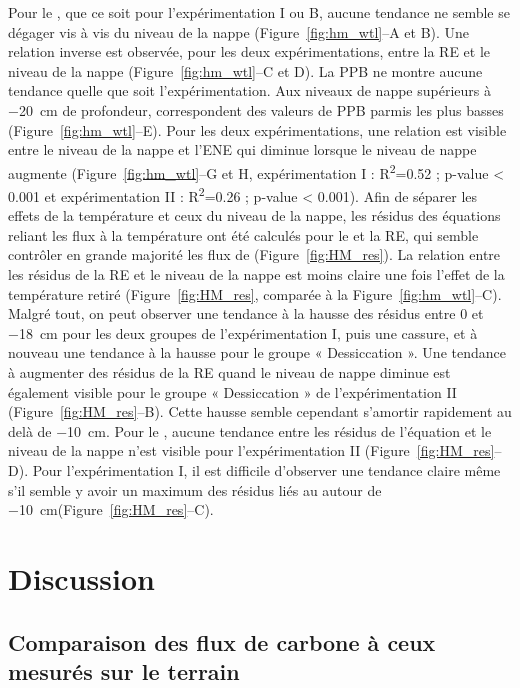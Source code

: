 Pour le \chh, que ce soit pour l'expérimentation I ou B, aucune tendance ne semble se dégager vis à vis du niveau de la nappe (Figure~\ref{fig:hm_wtl}--A et B).
Une relation inverse est observée, pour les deux expérimentations, entre la RE et le niveau de la nappe (Figure~\ref{fig:hm_wtl}--C et D).
La PPB ne montre aucune tendance quelle que soit l'expérimentation.
Aux niveaux de nappe supérieurs à \SI{-20}{\centi\metre} de profondeur, correspondent des valeurs de PPB parmis les plus basses (Figure~\ref{fig:hm_wtl}--E).
Pour les deux expérimentations, une relation est visible entre le niveau de la nappe et l'ENE qui diminue lorsque le niveau de nappe augmente (Figure~\ref{fig:hm_wtl}--G et H, expérimentation I : R\textsuperscript{2}=\num{0.52} ; p-value < \num{0.001} et  expérimentation II : R\textsuperscript{2}=\num{0.26} ; p-value < \num{0.001}).
Afin de séparer les effets de la température et ceux du niveau de la nappe, les résidus des équations reliant les flux à la température ont été calculés pour le \chh et la RE, qui semble contrôler en grande majorité les flux de \coo (Figure~\ref{fig:HM_res}).
La relation entre les résidus de la RE et le niveau de la nappe est moins claire une fois l'effet de la température retiré (Figure~\ref{fig:HM_res}, comparée à la Figure~\ref{fig:hm_wtl}--C).
Malgré tout, on peut observer une tendance à la hausse des résidus entre 0 et \SI{-18}{\centi\metre} pour les deux groupes de l'expérimentation I, puis une cassure, et à nouveau une tendance à la hausse pour le groupe « Dessiccation ».
Une tendance à augmenter des résidus de la RE quand le niveau de nappe diminue est également visible pour le groupe « Dessiccation » de l'expérimentation II (Figure~\ref{fig:HM_res}--B).
Cette hausse semble cependant s'amortir rapidement au delà de \SI{-10}{\centi\metre}.
Pour le \chh, aucune tendance entre les résidus de l'équation et le niveau de la nappe n'est visible pour l'expérimentation II (Figure~\ref{fig:HM_res}--D).
Pour l'expérimentation I, il est difficile d'observer une tendance claire même s'il semble y avoir un maximum des résidus liés au \chh autour de \SI{-10}{\centi\metre}(Figure~\ref{fig:HM_res}--C).


\section{Discussion}

\subsection{Comparaison des flux de carbone à ceux mesurés sur le terrain}
